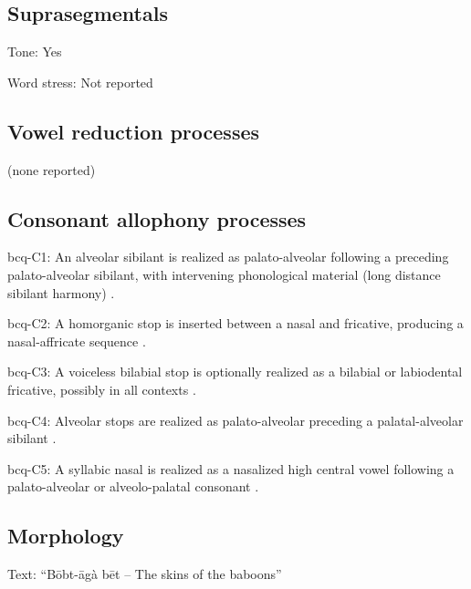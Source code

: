 {\subsection*{Suprasegmentals}
\begin{appendixdesc}
\item[Tone:] Yes

\item[Word stress:] Not reported
\end{appendixdesc}
\subsection*{Vowel reduction processes}

(none reported)
\subsection*{Consonant allophony processes}
\begin{appendixdesc}

\item[bcq-C1:] An alveolar sibilant is realized as palato-alveolar following a preceding palato-alveolar sibilant, with intervening phonological material (long distance sibilant harmony) \citep[67]{Rapold2006}.

\item[bcq-C2:] A homorganic stop is inserted between a nasal and fricative, producing a nasal-affricate sequence \citep[69]{Rapold2006}.

\item[bcq-C3:] A voiceless bilabial stop is optionally realized as a bilabial or labiodental fricative, possibly in all contexts \citep[73]{Rapold2006}.

\item[bcq-C4:] Alveolar stops are realized as palato-alveolar preceding a palatal-alveolar sibilant \citep[74]{Rapold2006}.

\item[bcq-C5:] A syllabic nasal is realized as a nasalized high central vowel following a palato-alveolar or alveolo-palatal consonant \citep[76]{Rapold2006}.
\end{appendixdesc}
\subsection*{Morphology}

\begin{appendixdesc}

\item[Text:] “Bōbt-āgà bēt -- The skins of the baboons” \citep[594--599]{Rapold2006}


\end{appendixdesc}}
